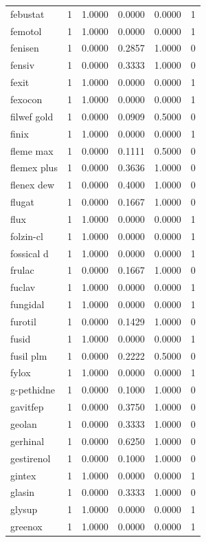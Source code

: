 \begin{longtable}{p{3.0cm}rrrrr}
febustat & 1 & 1.0000 & 0.0000 & 0.0000 & 1 \\
femotol & 1 & 1.0000 & 0.0000 & 0.0000 & 1 \\
fenisen & 1 & 0.0000 & 0.2857 & 1.0000 & 0 \\
fensiv & 1 & 0.0000 & 0.3333 & 1.0000 & 0 \\
fexit & 1 & 1.0000 & 0.0000 & 0.0000 & 1 \\
fexocon & 1 & 1.0000 & 0.0000 & 0.0000 & 1 \\
filwef gold & 1 & 0.0000 & 0.0909 & 0.5000 & 0 \\
finix & 1 & 1.0000 & 0.0000 & 0.0000 & 1 \\
fleme max & 1 & 0.0000 & 0.1111 & 0.5000 & 0 \\
flemex plus & 1 & 0.0000 & 0.3636 & 1.0000 & 0 \\
flenex dew & 1 & 0.0000 & 0.4000 & 1.0000 & 0 \\
flugat & 1 & 0.0000 & 0.1667 & 1.0000 & 0 \\
flux & 1 & 1.0000 & 0.0000 & 0.0000 & 1 \\
folzin-cl & 1 & 1.0000 & 0.0000 & 0.0000 & 1 \\
fossical d & 1 & 1.0000 & 0.0000 & 0.0000 & 1 \\
frulac & 1 & 0.0000 & 0.1667 & 1.0000 & 0 \\
fuclav & 1 & 1.0000 & 0.0000 & 0.0000 & 1 \\
fungidal & 1 & 1.0000 & 0.0000 & 0.0000 & 1 \\
furotil & 1 & 0.0000 & 0.1429 & 1.0000 & 0 \\
fusid & 1 & 1.0000 & 0.0000 & 0.0000 & 1 \\
fusil plm & 1 & 0.0000 & 0.2222 & 0.5000 & 0 \\
fylox & 1 & 1.0000 & 0.0000 & 0.0000 & 1 \\
g-pethidne & 1 & 0.0000 & 0.1000 & 1.0000 & 0 \\
gavitfep & 1 & 0.0000 & 0.3750 & 1.0000 & 0 \\
geolan & 1 & 0.0000 & 0.3333 & 1.0000 & 0 \\
gerhinal & 1 & 0.0000 & 0.6250 & 1.0000 & 0 \\
gestirenol & 1 & 0.0000 & 0.1000 & 1.0000 & 0 \\
gintex & 1 & 1.0000 & 0.0000 & 0.0000 & 1 \\
glasin & 1 & 0.0000 & 0.3333 & 1.0000 & 0 \\
glysup & 1 & 1.0000 & 0.0000 & 0.0000 & 1 \\
greenox & 1 & 1.0000 & 0.0000 & 0.0000 & 1 \\

\end{longtable}
